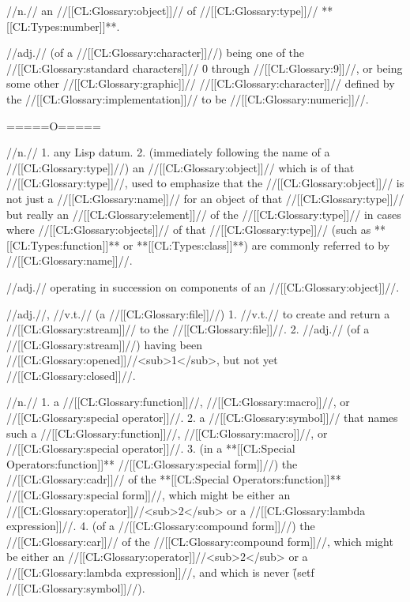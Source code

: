  //n.// an //[[CL:Glossary:object]]// of //[[CL:Glossary:type]]// **[[CL:Types:number]]**.

 //adj.// (of a //[[CL:Glossary:character]]//) being one of the //[[CL:Glossary:standard characters]]// \f{0} through //[[CL:Glossary:9]]//, or being some other //[[CL:Glossary:graphic]]// //[[CL:Glossary:character]]// defined by the //[[CL:Glossary:implementation]]// to be //[[CL:Glossary:numeric]]//.

=====O=====

 //n.// 1. any Lisp datum.  2. (immediately following the name of a //[[CL:Glossary:type]]//) an //[[CL:Glossary:object]]// which is of that //[[CL:Glossary:type]]//, used to emphasize that the //[[CL:Glossary:object]]// is not just a //[[CL:Glossary:name]]// for an object of that //[[CL:Glossary:type]]// but really an //[[CL:Glossary:element]]// of the //[[CL:Glossary:type]]// in cases where //[[CL:Glossary:objects]]// of that //[[CL:Glossary:type]]// (such as **[[CL:Types:function]]** or **[[CL:Types:class]]**) are commonly referred to by //[[CL:Glossary:name]]//. 

 //adj.// operating in succession on components of an //[[CL:Glossary:object]]//. 

 //adj.//, //v.t.// (a //[[CL:Glossary:file]]//) 1. //v.t.// to create and return a //[[CL:Glossary:stream]]// to the //[[CL:Glossary:file]]//. 2. //adj.// (of a //[[CL:Glossary:stream]]//) having been //[[CL:Glossary:opened]]//<sub>1</sub>, but not yet //[[CL:Glossary:closed]]//.

 //n.// 1. a //[[CL:Glossary:function]]//, //[[CL:Glossary:macro]]//, or //[[CL:Glossary:special operator]]//. 2. a //[[CL:Glossary:symbol]]// that names such a //[[CL:Glossary:function]]//, //[[CL:Glossary:macro]]//, or //[[CL:Glossary:special operator]]//. 3. (in a **[[CL:Special Operators:function]]** //[[CL:Glossary:special form]]//) the //[[CL:Glossary:cadr]]// of the **[[CL:Special Operators:function]]** //[[CL:Glossary:special form]]//, which might be either an //[[CL:Glossary:operator]]//<sub>2</sub> or a //[[CL:Glossary:lambda expression]]//. 4. (of a //[[CL:Glossary:compound form]]//) the //[[CL:Glossary:car]]// of the //[[CL:Glossary:compound form]]//, which might be either an //[[CL:Glossary:operator]]//<sub>2</sub> or a //[[CL:Glossary:lambda expression]]//, and which is never \f{(setf //[[CL:Glossary:symbol]]//)}.

